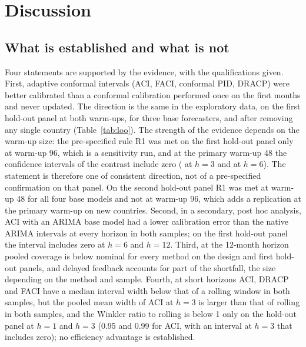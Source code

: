 \section{Discussion}\label{sec:discussion}

\subsection{What is established and what is not}

Four statements are supported by the evidence, with the qualifications given. First, adaptive conformal intervals (ACI, FACI, conformal PID, DRACP) were better calibrated than a conformal calibration performed once on the first months and never updated. The direction is the same in the exploratory data, on the first hold-out panel at both warm-ups, for three base forecasters, and after removing any single country (Table~\ref{tab:loo}). The strength of the evidence depends on the warm-up size: the pre-specified rule R1 was met on the first hold-out panel only at warm-up 96, which is a sensitivity run, and at the primary warm-up 48 the confidence intervals of the contrast include zero ( at $h=3$ and  at $h=6$). The statement is therefore one of consistent direction, not of a pre-specified confirmation on that panel. On the second hold-out panel R1 was met at warm-up 48 for all four base models and not at warm-up 96, which adds a replication at the primary warm-up on new countries. Second, in a secondary, post hoc analysis, ACI with an ARIMA base model had a lower calibration error than the native ARIMA intervals at every horizon in both samples; on the first hold-out panel the interval includes zero at $h=6$ and $h=12$. Third, at the 12-month horizon pooled coverage is below nominal for every method on the design and first hold-out panels, and delayed feedback accounts for part of the shortfall, the size depending on the method and sample. Fourth, at short horizons ACI, DRACP and FACI have a median interval width below that of a rolling window in both samples, but the pooled mean width of ACI at $h=3$ is larger than that of rolling in both samples, and the Winkler ratio to rolling is below 1 only on the hold-out panel at $h=1$ and $h=3$ (0.95 and 0.99 for ACI, with an interval at $h=3$ that includes zero); no efficiency advantage is established.

